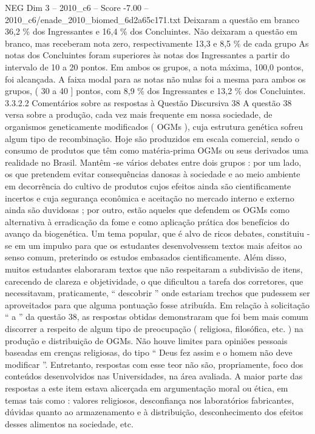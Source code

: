 \begin{textsample}{NEG Dim 3 – 2010\_c6 – Score -7.00 – 2010\_c6/enade\_2010\_biomed\_6d2a65c171.txt}
Deixaram a questão em branco 36,2 \% dos Ingressantes e 16,4 \% dos Concluintes.
Não deixaram a questão em branco, mas receberam nota zero, respectivamente 13,3 e 8,5 \% de cada grupo As notas dos Concluintes foram superiores às notas dos Ingressantes a partir do intervalo de 10 a 20 pontos.
Em ambos os grupos, a nota máxima, 100,0 pontos, foi alcançada.
A faixa modal para as notas não nulas foi a mesma para ambos os grupos, ( 30 a 40 ] pontos, com 8,9 \% dos Ingressantes e 13,2 \% dos Concluintes. 3.3.2.2 Comentários sobre as respostas à Questão Discursiva 38 A questão 38 versa sobre a produção, cada vez mais frequente em nossa sociedade, de organismos geneticamente modificados ( OGMs ), cuja estrutura genética sofreu algum tipo de recombinação.
Hoje são produzidos em escala comercial, sendo o consumo de produtos que têm como matéria-prima OGMs ou seus derivados uma realidade no Brasil.
Mantêm -se vários debates entre dois grupos : por um lado, os que pretendem evitar consequências danosas à sociedade e ao meio ambiente em decorrência do cultivo de produtos cujos efeitos ainda são cientificamente incertos e cuja segurança econômica e aceitação no mercado interno e externo ainda são duvidosas ; por outro, estão aqueles que defendem os OGMs como alternativa à erradicação da fome e como aplicação prática dos benefícios do avanço da biogenética.
Um tema popular, que é alvo de ricos debates, constituiu -se em um impulso para que os estudantes desenvolvessem textos mais afeitos ao senso comum, preterindo os estudos embasados cientificamente.
Além disso, muitos estudantes elaboraram textos que não respeitaram a subdivisão de itens, carecendo de clareza e objetividade, o que dificultou a tarefa dos corretores, que necessitavam, praticamente, “ descobrir ” onde estariam trechos que pudessem ser aproveitados para que alguma pontuação fosse atribuída.
Em relação à solicitação “ a ” da questão 38, as respostas obtidas demonstraram que foi bem mais comum discorrer a respeito de algum tipo de preocupação ( religiosa, filosófica, etc. ) na produção e distribuição de OGMs.
Não houve limites para opiniões pessoais baseadas em crenças religiosas, do tipo “ Deus fez assim e o homem não deve modificar ”.
Entretanto, respostas com esse teor não são, propriamente, foco dos conteúdos desenvolvidos nas Universidades, na área avaliada.
A maior parte das respostas a este item estava alicerçada em argumentação moral ou ética, em temas tais como : valores religiosos, desconfiança nos laboratórios fabricantes, dúvidas quanto ao armazenamento e à distribuição, desconhecimento dos efeitos desses alimentos na sociedade, etc.

\end{textsample}
